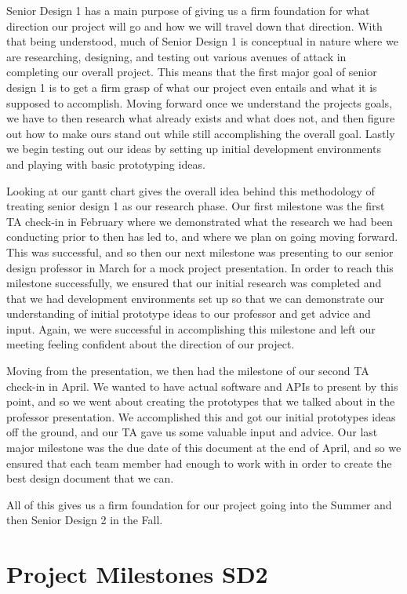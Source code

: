 \documentclass[12pt]{article}
\begin{document}
Senior Design 1 has a main purpose of giving us a firm foundation for what direction our project will go and how we will travel down that direction. With that being understood, much of Senior Design 1 is conceptual in nature where we are researching, designing, and testing out various avenues of attack in completing our overall project. This means that the first major goal of senior design 1 is to get a firm grasp of what our project even entails and what it is supposed to accomplish. Moving forward once we understand the projects goals, we have to then research what already exists and what does not, and then figure out how to make ours stand out while still accomplishing the overall goal. Lastly we begin testing out our ideas by setting up initial development environments and playing with basic prototyping ideas.

Looking at our gantt chart gives the overall idea behind this methodology of treating senior design 1 as our research phase. Our first milestone was the first TA check-in in February where we demonstrated what the research we had been conducting prior to then has led to, and where we plan on going moving forward. This was successful, and so then our next milestone was presenting to our senior design professor in March for a mock project presentation. In order to reach this milestone successfully, we ensured that our initial research was completed and that we had development environments set up so that we can demonstrate our understanding of initial prototype ideas to our professor and get advice and input. Again, we were successful in accomplishing this milestone and left our meeting feeling confident about the direction of our project.

Moving from the presentation, we then had the milestone of our second TA check-in in April. We wanted to have actual software and APIs to present by this point, and so we went about creating the prototypes that we talked about in the professor presentation. We accomplished this and got our initial prototypes ideas off the ground, and our TA gave us some valuable input and advice. Our last major milestone was the due date of this document at the end of April, and so we ensured that each team member had enough to work with in order to create the best design document that we can.

All of this gives us a firm foundation for our project going into the Summer and then Senior Design 2 in the Fall.

\section{Project Milestones SD2}
\end{document}
